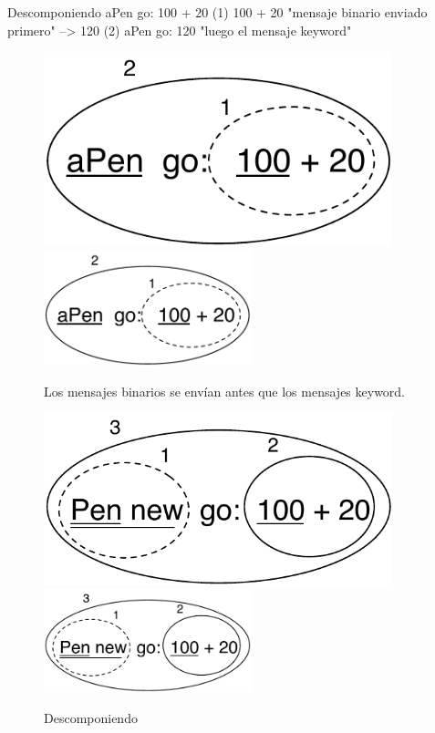 \documentclass[a4paper,10pt,twoside]{book}
\begin{document}
\begin{example}[decGo]{Descomponiendo }{}
      aPen go: 100 + 20   
(1)                 100 + 20           "mensaje binario enviado primero"
                   -->   120
(2)  aPen go: 120                   "luego el mensaje keyword"
\end{example}

\begin{figure}[htb]
\begin{minipage}{0.48\textwidth}
	\ifluluelse
		{\centerline{\includegraphics[width=0.9\textwidth]{uKeyBin}}}
		{\centerline{\includegraphics[width=6cm]{uKeyBin}}}
	\caption{Los mensajes binarios se env\'ian antes que los mensajes keyword.}
\end{minipage}
\hfill
\begin{minipage}{0.48\textwidth}
	\begin{center}
	\ifluluelse
		{\includegraphics[width=0.9\textwidth]{uunKeyBin}}
		{\includegraphics[width=6cm]{uunKeyBin}}
\caption{Descomponiendo }
\end{center}
\end{minipage}
\end{figure}
\end{document}
